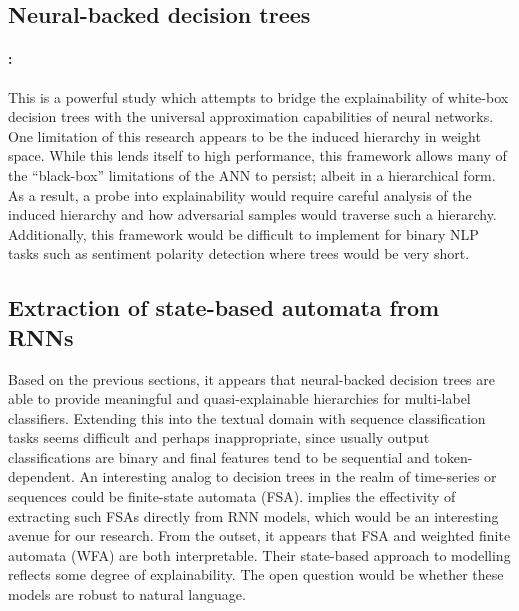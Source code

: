 \subsection{Neural-backed decision trees}

\paragraph{\citealt{wan2020nbdt}:} This is a powerful study which attempts to bridge the explainability of white-box decision trees with the universal approximation capabilities of neural networks. One limitation of this research appears to be the induced hierarchy in weight space. While this lends itself to high performance, this framework allows many of the ``black-box'' limitations of the ANN to persist; albeit in a hierarchical form. As a result, a probe into explainability would require careful analysis of the induced hierarchy and how adversarial samples would traverse such a hierarchy. Additionally, this framework would be difficult to implement for binary NLP tasks such as sentiment polarity detection where trees would be very short.

\subsection{Extraction of state-based automata from RNNs}

Based on the previous sections, it appears that neural-backed decision trees are able to provide meaningful and quasi-explainable hierarchies for multi-label classifiers. Extending this into the textual domain with sequence classification tasks seems difficult and perhaps inappropriate, since usually output classifications are binary and final features tend to be sequential and token-dependent. An interesting analog to decision trees in the realm of time-series or sequences could be finite-state automata (FSA). \citet{hou2018learning} implies the effectivity of extracting such FSAs directly from RNN models, which would be an interesting avenue for our research. From the outset, it appears that FSA and weighted finite automata (WFA) are both interpretable. Their state-based approach to modelling reflects some degree of explainability. The open question would be whether these models are robust to natural language.


